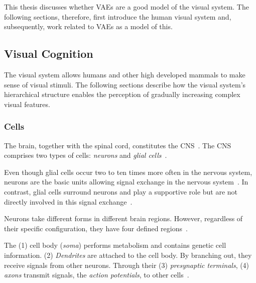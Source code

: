 This thesis discusses whether \acp{VAE} are a good model of the visual system.
The following sections, therefore, first introduce the human visual system and, subsequently, work related to \acp{VAE} as a model of this.

\subsection{Visual Cognition}\label{subsec:human-brain-structure}

The visual system allows humans and other high developed mammals to make sense of visual stimuli.
The following sections describe how the visual system's hierarchical structure enables the perception of gradually increasing complex visual features.

\subsubsection{Cells}

The brain, together with the spinal cord, constitutes the \ac{CNS}~\citep[p. 340]{mack2013principles}.
The \ac{CNS} comprises two types of cells: \textit{neurons} and \textit{glial cells}~\citep[p. 71]{mack2013principles}.

Even though glial cells occur two to ten times more often in the nervous system, neurons are the basic units allowing signal exchange in the nervous system~\citep[p. 24]{mack2013principles}.
In contrast, glial cells surround neurons and play a supportive role but are not directly involved in this signal exchange~\citep[p. 26]{mack2013principles}.

Neurons take different forms in different brain regions.
However, regardless of their specific configuration, they have four defined regions~\citep[p. 22]{mack2013principles}.

The (1) cell body (\textit{soma}) performs metabolism and contains genetic cell information.
(2) \textit{Dendrites} are attached to the cell body.
By branching out, they receive signals from other neurons.
Through their (3) \textit{presynaptic terminals}, (4) \textit{axons} transmit signals, the \textit{action potentials}, to other cells~\citep[pp. 22, 23]{mack2013principles}.


